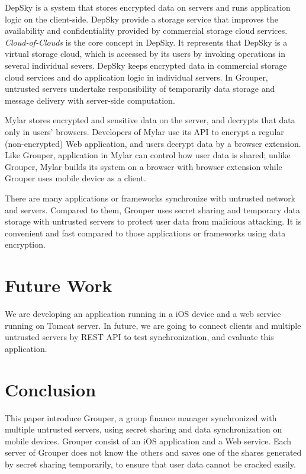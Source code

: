 \documentclass[twocolumn,10pt]{article}
\begin{document}
DepSky\cite{bessani2013depsky} is a system that stores encrypted data on servers and runs application logic on the client-side\cite{wang2016sieve}. DepSky provide a storage service that improves the availability and confidentiality provided by commercial storage cloud services. \emph{Cloud-of-Clouds} is the core concept in DepSky. It represents that DepSky is a virtual storage cloud, which is accessed by its users by invoking operations in several individual severs. DepSky keeps encrypted data in commercial storage cloud services and do application logic in individual servers. In Grouper,  untrusted servers undertake responsibility of temporarily data storage and message delivery with server-side computation.

Mylar\cite{popa2014building} stores encrypted and sensitive data on the server, and decrypts that data only in users’ browsers. Developers of Mylar use its API to encrypt a regular (non-encrypted) Web application, and users decrypt data by a browser extension. Like Grouper, application in Mylar can control how user data is shared\cite{wang2016sieve}; unlike Grouper, Mylar builds its system on a browser with browser extension while Grouper uses mobile device as a client.

There are many applications or frameworks synchronize with untrusted network and servers. Compared to them, Grouper uses secret sharing and temporary data storage with untrusted servers to protect user data from malicious attacking. It is convenient and fast compared to those applications or frameworks using data encryption.

\section{Future Work}

We are developing an application running in a iOS device and a web service running on Tomcat server. In future, we are going to connect clients and multiple untrusted servers by REST API to test synchronization, and evaluate this application.

\section{Conclusion}

This paper introduce Grouper, a group finance manager synchronized with multiple untrusted servers, using secret sharing and data synchronization on mobile devices. Grouper consist of an iOS application and a Web service.  Each server of Grouper does not know the others and saves one of the shares generated by secret sharing temporarily, to ensure that user data cannot be cracked easily. 


{
	\footnotesize
	
}
\end{document}
